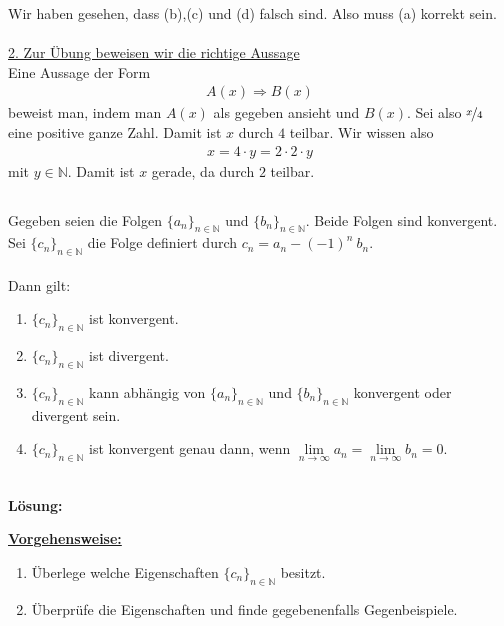 Wir haben gesehen, dass (b),(c) und (d) falsch sind. 
Also muss (a) korrekt sein.\\
\\
\underline{2. Zur Übung beweisen wir die richtige Aussage}\\
Eine Aussage der Form 
\begin{align*}
A(x) \Rightarrow B(x)
\end{align*}
beweist man, indem man $A(x)$ als gegeben ansieht und $B(x)$.
Sei also $\nicefrac{x}{4}$ eine positive ganze Zahl.
Damit ist $x$ durch $4$ teilbar.
Wir wissen also 
\begin{align*}
x = 4 \cdot y = 2 \cdot 2 \cdot y
\end{align*}
mit $y \in \mathbb{N}$. Damit ist $x$ gerade, da durch $2$ teilbar.
\newpage
\subsection*{}
Gegeben seien die Folgen $\lbrace a_n \rbrace_{ n\in \mathbb{N}}$ und $\lbrace b_n\rbrace_{ n\in \mathbb{N}}$.
Beide Folgen sind konvergent.
Sei $\lbrace c_n\rbrace_{ n\in \mathbb{N}}$ die Folge definiert durch $c_n = a_n - (-1)^n \ b_n$.\\
\\
Dann gilt: 
\renewcommand{\labelenumi}{(\alph{enumi})}
\begin{enumerate}
\item $\lbrace c_n\rbrace_{ n\in \mathbb{N}}$ ist konvergent.
\item $\lbrace c_n\rbrace_{ n\in \mathbb{N}}$ ist divergent.
\item $\lbrace c_n\rbrace_{ n\in \mathbb{N}}$ kann abhängig von $\lbrace a_n\rbrace_{ n\in \mathbb{N}}$ und $\lbrace b_n\rbrace_{ n\in \mathbb{N}}$ konvergent oder divergent sein.
\item $\lbrace c_n\rbrace_{ n\in \mathbb{N}}$ ist konvergent genau dann, wenn
$ \lim \limits_{n  \rightarrow \infty} a_n = \lim \limits_{n  \rightarrow \infty} b_n = 0  $.
\end{enumerate}
\ \\
\textbf{Lösung:}
\begin{mdframed}
\underline{\textbf{Vorgehensweise:}}
\renewcommand{\labelenumi}{\theenumi.}
\begin{enumerate}
\item Überlege  welche Eigenschaften $\lbrace c_n\rbrace_{ n\in \mathbb{N}}$ besitzt.
\item Überprüfe die Eigenschaften und finde gegebenenfalls Gegenbeispiele.
\end{enumerate}
\end{mdframed}

